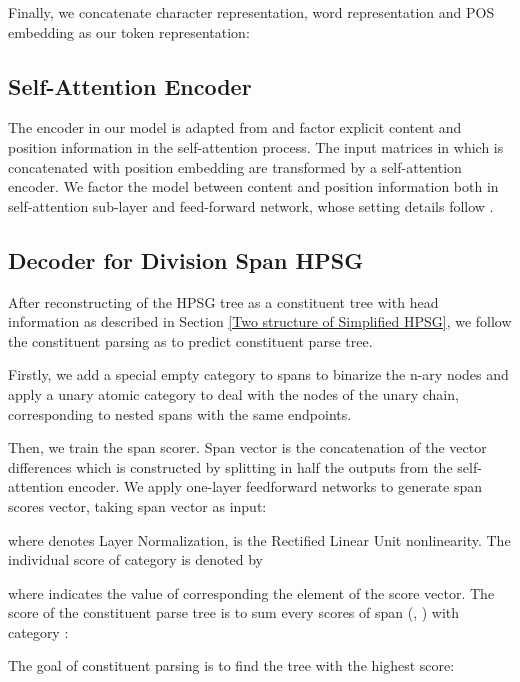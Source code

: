 \documentclass[11pt,a4paper]{article}
\begin{document}
Finally, we concatenate character representation, word representation
and POS embedding as our token representation:


\label{Token Representation}

\subsection{Self-Attention Encoder}

The encoder in our model is adapted from \cite{Vaswani17} and factor explicit content and position information in the self-attention process. The input matrices  in which  is concatenated with position embedding are transformed by a self-attention encoder. We factor the model between content and position information both in self-attention sub-layer and feed-forward network, whose setting details follow \cite{Kitaev-2018-SelfAttentive}. 

\subsection{Decoder for Division Span HPSG}

After reconstructing of the HPSG tree as a constituent tree with head information as described in Section \ref{Two structure of Simplified HPSG}, we follow the constituent parsing as \cite{Kitaev-2018-SelfAttentive,Gaddy} to predict constituent parse tree.

Firstly, we add a special empty category  to spans to binarize the n-ary nodes and apply a unary atomic category to deal with the nodes of the unary chain, corresponding to nested spans with the same endpoints.



Then, we train the span scorer.
Span vector  is the concatenation of the vector differences  
which  is constructed by splitting in half the outputs from the self-attention encoder. 
We apply one-layer feedforward networks to generate span scores vector, taking span vector  as input:

where  denotes Layer Normalization,  is the Rectified Linear Unit nonlinearity.
The individual score of category  is denoted by

where  indicates the value of corresponding the element  of the score vector.
The score  of the constituent parse tree  is to sum every scores of span (, ) with category : 

The goal of constituent parsing is to find the tree with the highest score:
\end{document}
